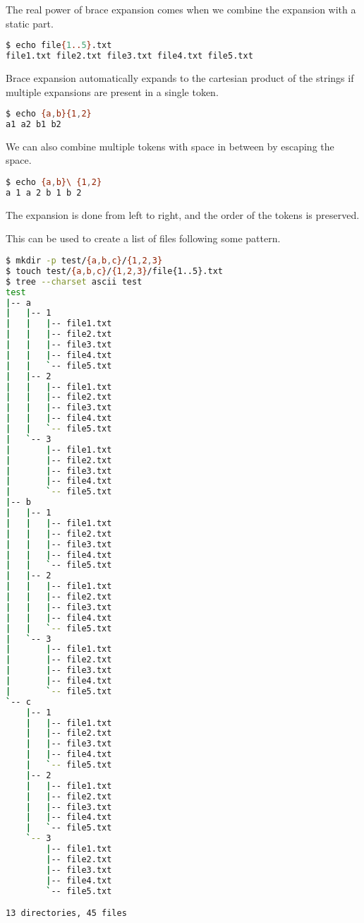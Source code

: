 The real power of brace expansion comes when we combine the expansion with a static part.

\begin{lstlisting}[language=bash]
$ echo file{1..5}.txt
file1.txt file2.txt file3.txt file4.txt file5.txt
\end{lstlisting}

Brace expansion automatically expands to the cartesian product of the strings if multiple expansions are present in a single token.

\begin{lstlisting}[language=bash]
$ echo {a,b}{1,2}
a1 a2 b1 b2
\end{lstlisting}

We can also combine multiple tokens with space in between by escaping the space.

\begin{lstlisting}[language=bash]
$ echo {a,b}\ {1,2}
a 1 a 2 b 1 b 2
\end{lstlisting}

The expansion is done from left to right, and the order of the tokens is preserved.

This can be used to create a list of files following some pattern.

\begin{lstlisting}[language=bash]
$ mkdir -p test/{a,b,c}/{1,2,3}
$ touch test/{a,b,c}/{1,2,3}/file{1..5}.txt
$ tree --charset ascii test
test
|-- a
|   |-- 1
|   |   |-- file1.txt
|   |   |-- file2.txt
|   |   |-- file3.txt
|   |   |-- file4.txt
|   |   `-- file5.txt
|   |-- 2
|   |   |-- file1.txt
|   |   |-- file2.txt
|   |   |-- file3.txt
|   |   |-- file4.txt
|   |   `-- file5.txt
|   `-- 3
|       |-- file1.txt
|       |-- file2.txt
|       |-- file3.txt
|       |-- file4.txt
|       `-- file5.txt
|-- b
|   |-- 1
|   |   |-- file1.txt
|   |   |-- file2.txt
|   |   |-- file3.txt
|   |   |-- file4.txt
|   |   `-- file5.txt
|   |-- 2
|   |   |-- file1.txt
|   |   |-- file2.txt
|   |   |-- file3.txt
|   |   |-- file4.txt
|   |   `-- file5.txt
|   `-- 3
|       |-- file1.txt
|       |-- file2.txt
|       |-- file3.txt
|       |-- file4.txt
|       `-- file5.txt
`-- c
    |-- 1
    |   |-- file1.txt
    |   |-- file2.txt
    |   |-- file3.txt
    |   |-- file4.txt
    |   `-- file5.txt
    |-- 2
    |   |-- file1.txt
    |   |-- file2.txt
    |   |-- file3.txt
    |   |-- file4.txt
    |   `-- file5.txt
    `-- 3
        |-- file1.txt
        |-- file2.txt
        |-- file3.txt
        |-- file4.txt
        `-- file5.txt

13 directories, 45 files
\end{lstlisting}

